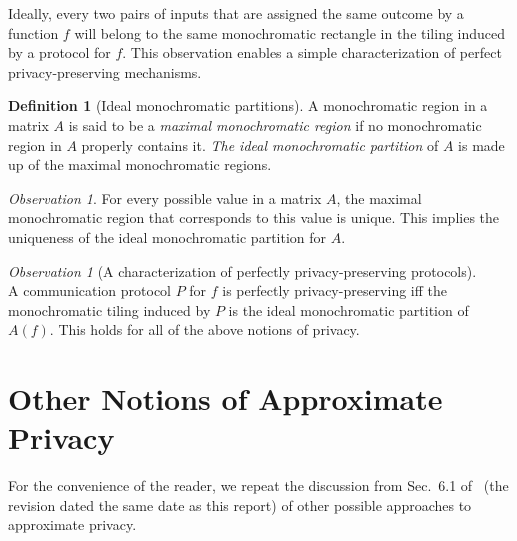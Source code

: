 \documentclass{article}
\theoremstyle{theorem}
\theoremstyle{definition}
\newtheorem{definition}[theorem]{Definition}
\theoremstyle{remark}
\newtheorem{obs}[theorem]{Observation}
\begin{document}
Ideally, every two pairs of inputs that are assigned the same
outcome by a function $f$ will belong to the same monochromatic
rectangle in the tiling induced by a protocol for $f$. This
observation enables a simple characterization of perfect
privacy-preserving mechanisms.

\begin{definition} [Ideal monochromatic partitions]
A monochromatic region in a matrix $A$ is said to be a {\em maximal
monochromatic region} if no monochromatic region in $A$ properly
contains it. \emph{The ideal monochromatic partition} of $A$ is made
up of the maximal monochromatic regions.
\end{definition}

\begin{obs}
For every possible value in a matrix $A$, the maximal monochromatic
region that corresponds to this value is unique. This implies the
uniqueness of the ideal monochromatic partition for $A$.
\end{obs}

\begin{obs}[A characterization of perfectly privacy-preserving protocols]\label{obs_privacy=maximal}
\ \\ A communication protocol $P$ for $f$ is perfectly privacy-preserving
iff the monochromatic til\-ing induced by $P$ is the ideal
monochromatic partition of $A(f)$. This holds for all of the above
notions of privacy.
\end{obs}

\section{Other Notions of Approximate Privacy}\label{ap:alternate}

For the convenience of the reader, we repeat the discussion from Sec.~6.1 of~\cite{fjs09tr14} (the revision dated the same date as this report) of other possible approaches to approximate privacy.
\end{document}
